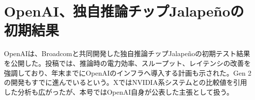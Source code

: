 \section{OpenAI、独自推論チップJalapeñoの初期結果}
OpenAIは、Broadcomと共同開発した独自推論チップJalapeñoの初期テスト結果を公開した。投稿では、推論時の電力効率、スループット、レイテンシの改善を強調しており、年末までにOpenAIのインフラへ導入する計画も示された。Gen 2の開発もすでに進んでいるという。XではNVIDIA系システムとの比較値を引用した分析も広がったが、本号ではOpenAI自身が公表した主張として扱う。

